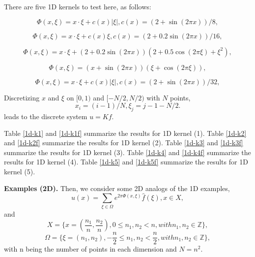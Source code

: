 \documentclass[11pt]{article}
\begin{document}
There are five 1D kernels to test here, as follows:

\begin{equation}
\Phi(x,\xi) = x\cdot\xi + c(x)|\xi|, c(x) = (2+\sin(2\pi x))/8,
\end{equation}

\begin{equation}
\Phi(x,\xi) = x\cdot\xi + c(x)\xi, c(x) = (2+0.2 \sin(2\pi x))/16,
\end{equation}

\begin{equation}
\Phi(x,\xi) = x\cdot\xi + (2+0.2 \sin(2\pi x))(2+0.5\cos(2\pi \xi)+\xi^2),
\end{equation}

\begin{equation}
\Phi(x,\xi) = (x + \sin(2\pi x))(\xi + \cos(2\pi \xi)),
\end{equation}

\begin{equation}
\Phi(x,\xi) = x\cdot\xi + c(x)|\xi|, c(x) = (2+\sin(2\pi x))/32,
\end{equation}

Discretizing $x$ and $\xi$ on $[0,1)$ and $[-N/2, N/2)$ with $N$ points,
\begin{equation*}
x_{i} = (i-1)/N, \xi_{j} = j-1-N/2.
\end{equation*}
leads to the discrete system $u = Kf$.

Table \ref{1d-k1} and \ref{1d-k1f} summarize the results for 1D kernel (1).
Table \ref{1d-k2} and \ref{1d-k2f} summarize the results for 1D kernel (2).
Table \ref{1d-k3} and \ref{1d-k3f} summarize the results for 1D kernel (3).
Table \ref{1d-k4} and \ref{1d-k4f} summarize the results for 1D kernel (4).
Table \ref{1d-k5} and \ref{1d-k5f} summarize the results for 1D kernel (5).

\textbf{Examples (2D).} Then, we consider some 2D analogs of the 1D examples,
\begin{equation*}
u(x) = \sum\limits_{\xi\in \Omega}e^{2\pi \Phi(x,\xi)}\hat{f}(\xi),x\in X,
\end{equation*}
and 
\begin{equation*}
X = \{x=(\dfrac{n_{1}}{n}, \dfrac{n_{2}}{n}), 0\leq n_{1},n_{2} < n, with n_{1}, n_{2} \in\mathbb{Z}\},
\end{equation*}
\begin{equation*}
\Omega = \{\xi=(n_{1}, n_{2}), -\dfrac{n}{2}\leq n_{1},n_{2} < \dfrac{n}{2}, with n_{1}, n_{2} \in\mathbb{Z}\},
\end{equation*}
with n being the number of points in each dimension and $N = n^2$.
\end{document}

